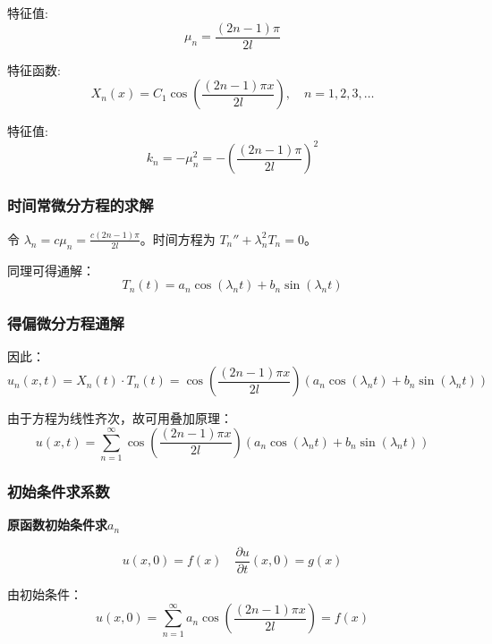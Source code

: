 \documentclass[a4paper, 12pt, oneside]{article} %
\numberwithin{subsection}{section}
\numberwithin{subsubsection}{subsection}
\theoremstyle{plain}
\theoremstyle{definition}
\theoremstyle{remark}
\begin{document}
		特征值:
		\begin{equation}
			\mu_n = \frac{(2n-1)\pi}{2l}
		\end{equation}
		
		特征函数:
		\begin{equation}
			X_n(x) = C_1 \cos\left(\frac{(2n-1)\pi x}{2l}\right), \quad n = 1, 2, 3, \ldots
		\end{equation}
		
		特征值:
		\begin{equation}
			k_n = -\mu_n^2 = -\left(\frac{(2n-1)\pi}{2l}\right)^2
		\end{equation}
		
		\subsubsection{时间常微分方程的求解}
		令 $\lambda_n = c \mu_n = \frac{c(2n-1)\pi}{2l}$。时间方程为 $T_n'' + \lambda_n^2 T_n = 0$。
		
		同理可得通解：
		\begin{equation}
			T_n(t) = a_n \cos(\lambda_n t) + b_n \sin(\lambda_n t)
		\end{equation}
		
		\subsubsection{得偏微分方程通解}
		因此：
		\begin{equation}
			u_n(x, t) = X_n(t) \cdot T_n(t) = \cos\left(\frac{(2n-1)\pi x}{2l}\right) \left( a_n \cos(\lambda_n t) + b_n \sin(\lambda_n t) \right)
		\end{equation}
		
		由于方程为线性齐次，故可用叠加原理：
		\begin{equation}
			u(x, t) = \sum_{n=1}^{\infty} \cos\left(\frac{(2n-1)\pi x}{2l}\right) \left( a_n \cos(\lambda_n t) + b_n \sin(\lambda_n t) \right)
		\end{equation}
		
		\subsubsection{初始条件求系数}
		\noindent
		\textbf{原函数初始条件求$a_n$}
		
		\begin{equation}
			u(x, 0) = f(x) \quad \frac{\partial u}{\partial t}(x, 0) = g(x)
		\end{equation}
		
		由初始条件：
		\begin{equation}
			u(x, 0) = \sum_{n=1}^{\infty} a_n \cos\left(\frac{(2n-1)\pi x}{2l}\right) = f(x)
		\end{equation}
		
\end{document}

